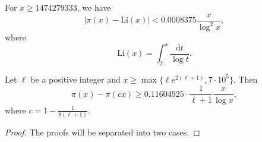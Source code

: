 \documentclass[10pt,a4paper]{amsart}
\def\Li{{\mathrm{Li}}}
\def\d{{\mathrm{d}}}
\begin{document}
 \begin{lemma}\label{lem-1} For $x\ge 1474279333$, we have
 	$$\big|\pi (x)-\Li (x)\big|<0.0008375\frac{x}{\log^2 x}, $$
 	where
 	$$\Li (x)=\int_2^x \frac{\d t}{\log t} .$$
 \end{lemma}

 \begin{lemma}\label{lem-2}
 	Let $\ell$ be a positive integer and $x\geq \max\{\ell e^{2(\ell+1)},7\cdot 10^{5}\}$. Then
 	\begin{equation*}
 		\pi(x)-\pi(cx)\geq 0.11604925 \cdot \frac{1}{\ell+1} \frac{x}{\log x},
 	\end{equation*}
 	where $c=1-\frac{1}{8(\ell+1)}$.
 \end{lemma}

 \begin{proof}
 The proofs will be separated into two cases.
 	

\end{proof}
\end{document}
